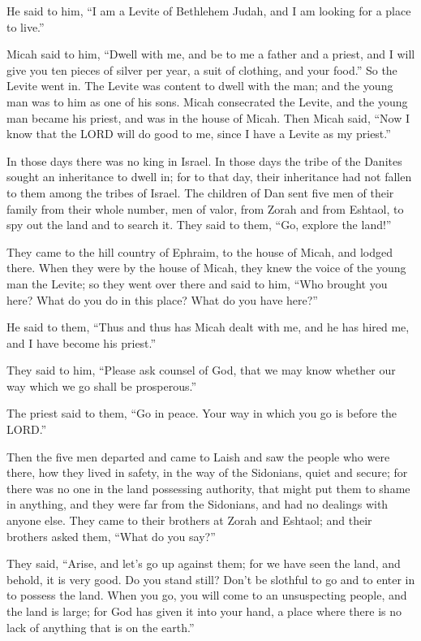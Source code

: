 He said to him, “I am a Levite of Bethlehem Judah, and I am looking for a place to live.”

\myverse{}Micah said to him, “Dwell with me, and be to me a father and
a priest, and I will give you ten pieces of silver per year, a suit of clothing, and your food.” So the
Levite went in.
\myverse{}The Levite was content to dwell with the man; and the young man was to him
as one of his sons.
\myverse{}Micah consecrated the Levite, and the young man became his priest, and was
in the house of Micah.
\myverse{}Then Micah said, “Now I know that the LORD will do good to me, since I have
a Levite as my priest.”


\mychapter{} \myverse*{}In those days there was no king in Israel. In those days the tribe
of the Danites sought an inheritance to dwell in; for to that day, their inheritance had not fallen to
them among the tribes of Israel.
\myverse{}The children of Dan sent five men of their family from their whole number,
men of valor, from Zorah and from Eshtaol, to spy out the land and to search it. They said to them, “Go,
explore the land!”

They came to the hill country of Ephraim, to the house of Micah, and lodged there.
\myverse{}When they were by the house of Micah, they knew the voice of the young man
the Levite; so they went over there and said to him, “Who brought you here? What do you do in this place?
What do you have here?”

\myverse{}He said to them, “Thus and thus has Micah dealt with me, and he
has hired me, and I have become his priest.”

\myverse{}They said to him, “Please ask counsel of God, that we may know
whether our way which we go shall be prosperous.”

\myverse{}The priest said to them, “Go in peace. Your way in which you go
is before the LORD.”

\myverse{}Then the five men departed and came to Laish and saw the people
who were there, how they lived in safety, in the way of the Sidonians, quiet and secure; for there was
no one in the land possessing authority, that might put them to shame in anything, and they were far from
the Sidonians, and had no dealings with anyone else.
\myverse{}They came to their brothers at Zorah and Eshtaol; and their brothers asked
them, “What do you say?”

\myverse{}They said, “Arise, and let’s go up against them; for we have seen
the land, and behold, it is very good. Do you stand still? Don’t be slothful to go and to enter in to
possess the land.
\myverse{}When you go, you will come to an unsuspecting people, and the land is large;
for God has given it into your hand, a place where there is no lack of anything that is on the earth.”

